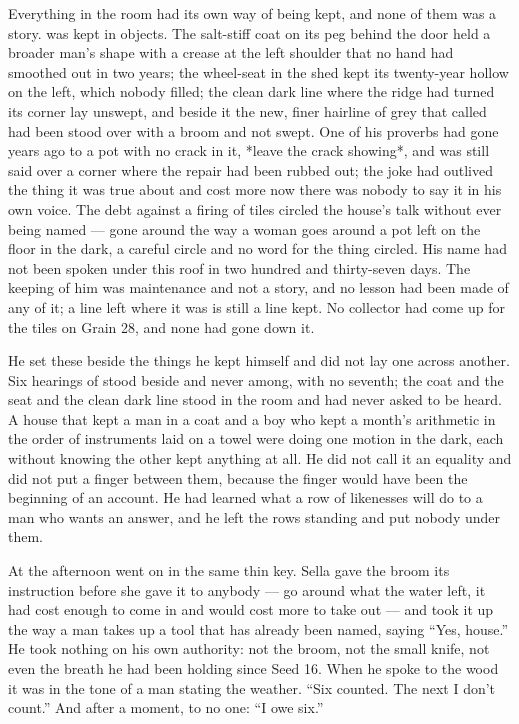 Everything in the room had its own way of being kept, and none of them was a story.  was kept in objects. The salt-stiff coat on its peg behind the door held a broader man's shape with a crease at the left shoulder that no hand had smoothed out in two years; the wheel-seat in the shed kept its twenty-year hollow on the left, which nobody filled; the clean dark line where the  ridge had turned its corner lay unswept, and beside it the new, finer hairline of grey that  called  had been stood over with a broom and not swept. One of his proverbs had gone years ago to a pot with no crack in it, *leave the crack showing*, and was still said over a corner where the repair had been rubbed out; the joke had outlived the thing it was true about and cost more now there was nobody to say it in his own voice. The debt against a firing of tiles circled the house's talk without ever being named — gone around the way a woman goes around a pot left on the floor in the dark, a careful circle and no word for the thing circled. His name had not been spoken under this roof in two hundred and thirty-seven days. The keeping of him was maintenance and not a story, and no lesson had been made of any of it; a line left where it was is still a line kept. No collector had come up  for the tiles on Grain 28, and none had gone down it.

He set these beside the things he kept himself and did not lay one across another. Six hearings of  stood beside and never among, with no seventh; the coat and the seat and the clean dark line stood in the room and had never asked to be heard. A house that kept a man in a coat and a boy who kept a month's arithmetic in the order of instruments laid on a towel were doing one motion in the dark, each without knowing the other kept anything at all. He did not call it an equality and did not put a finger between them, because the finger would have been the beginning of an account. He had learned what a row of likenesses will do to a man who wants an answer, and he left the rows standing and put nobody under them.

\scenebreak

At  the afternoon went on in the same thin key. Sella gave the broom its instruction before she gave it to anybody — go around what the water left, it had cost enough to come in and would cost more to take out — and  took it up the way a man takes up a tool that has already been named, saying “Yes, house.” He took nothing on his own authority: not the broom, not the small knife, not even the breath he had been holding since Seed 16. When he spoke to the wood it was in the tone of a man stating the weather. “Six counted. The next I don't count.” And after a moment, to no one: “I owe six.”

